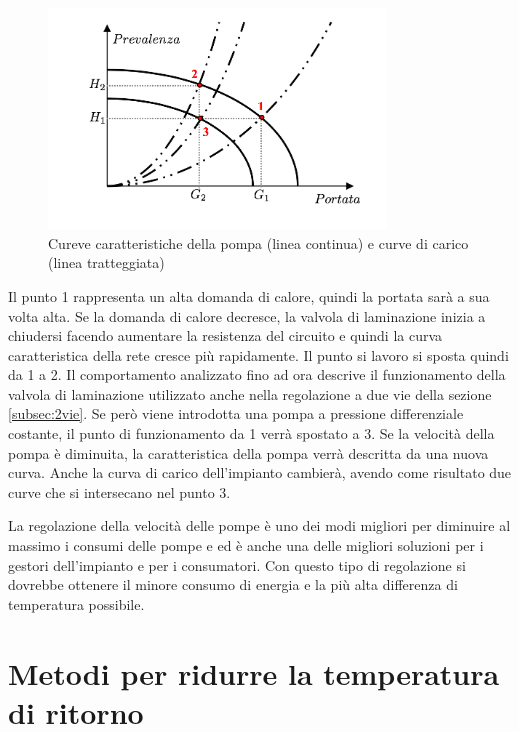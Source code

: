\documentclass[laurea,oneside,11pt]{USiena_tesiLM}
\begin{document}
\begin{figure}[!ht]
\centering
\includegraphics[width=0.8\textwidth]{figure/giri_variabili}
\caption{Cureve caratteristiche della pompa (linea continua) e curve di carico (linea tratteggiata)}
\label{fig:giri_variabili}
\end{figure}

Il punto 1 rappresenta un alta domanda di calore, quindi la portata sarà a sua volta alta. Se la domanda di calore decresce, la valvola di laminazione inizia a chiudersi facendo aumentare la resistenza del circuito e quindi la curva caratteristica della rete cresce più rapidamente. Il punto si lavoro si sposta quindi da 1 a 2. Il comportamento analizzato fino ad ora descrive il funzionamento della valvola di laminazione utilizzato anche nella regolazione a due vie della sezione \ref{subsec:2vie}. Se però viene introdotta una pompa a pressione differenziale costante, il punto di funzionamento da 1 verrà spostato a 3. Se la velocità della pompa è diminuita, la caratteristica della pompa verrà descritta da una nuova curva. Anche la curva di carico dell'impianto cambierà, avendo come risultato due curve che si intersecano nel punto 3.      

La regolazione della velocità delle pompe è uno dei modi migliori per diminuire al massimo i consumi delle pompe e ed è anche una delle migliori soluzioni per i gestori dell'impianto e per i consumatori. Con questo tipo di regolazione si dovrebbe ottenere il minore consumo di energia e la più alta differenza di temperatura possibile.

\section{Metodi per ridurre la temperatura di ritorno}  
\end{document}
